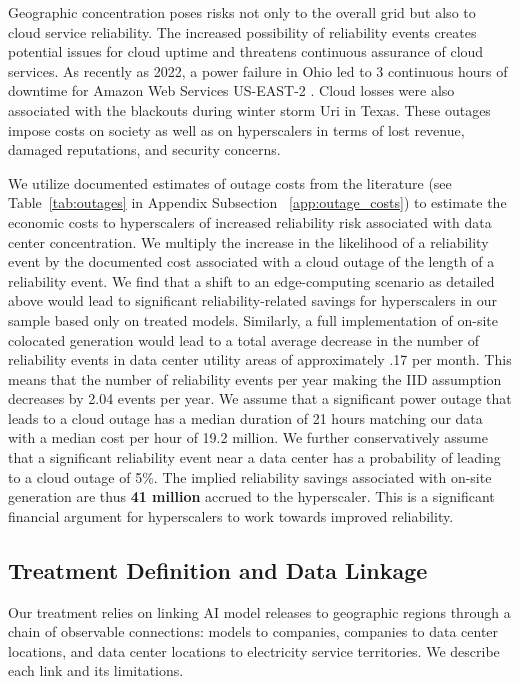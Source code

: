 \documentclass[a4paper,fleqn,longmktitle]{cas-sc}
\begin{document}
Geographic concentration poses risks not only to the overall grid but also to cloud service reliability. The increased possibility of reliability events creates potential issues for cloud uptime and threatens continuous assurance of cloud services. As recently as 2022, a power failure in Ohio led to 3 continuous hours of downtime for Amazon Web Services US-EAST-2 \citep{Eisenberg2025AWSOutage}. Cloud losses were also associated with the blackouts during winter storm Uri in Texas. These outages impose costs on society as well as on hyperscalers in terms of lost revenue, damaged reputations, and security concerns.

We utilize documented estimates of outage costs from the literature (see Table~\ref{tab:outages} in Appendix Subsection ~\ref{app:outage_costs}) to estimate the economic costs to hyperscalers of increased reliability risk associated with data center concentration. We multiply the increase in the likelihood of a reliability event by the documented cost associated with a cloud outage of the length of a reliability event. We find that a shift to an edge-computing scenario as detailed above would lead to significant reliability-related savings for hyperscalers in our sample based only on treated models. Similarly, a full implementation of on-site colocated generation would lead to a total average decrease in the number of reliability events in data center utility areas of approximately .17 per month. This means that the number of reliability events per year making the IID assumption decreases by 2.04 events per year. We assume that a significant power outage that leads to a cloud outage has a median duration of 21 hours matching our data with a median cost per hour of 19.2 million. We further conservatively assume that a significant reliability event near a data center has a probability of leading to a cloud outage of 5\%. The implied reliability savings associated with on-site generation are thus \textbf{41 million} accrued to the hyperscaler. This is a significant financial argument for hyperscalers to work towards improved reliability.

\subsection{Treatment Definition and Data Linkage}
\label{subsec:treatment}

Our treatment relies on linking AI model releases to geographic regions through a chain of observable connections: models to companies, companies to data center locations, and data center locations to electricity service territories. We describe each link and its limitations.
\end{document}
